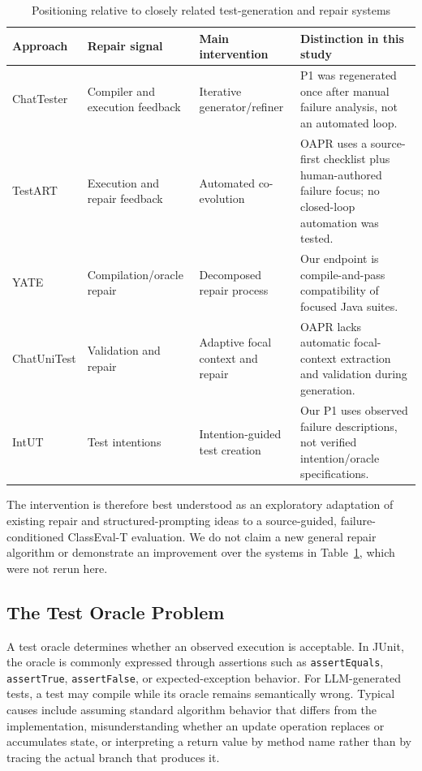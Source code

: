 \documentclass[conference]{IEEEtran}
\begin{document}
\begin{table}[t]
\caption{Positioning relative to closely related test-generation and repair systems}
\label{tab:prior}
\centering\scriptsize
\begin{tabularx}{\textwidth}{@{}l l X X@{}}
\toprule
Approach & Repair signal & Main intervention & Distinction in this study \\
\midrule
ChatTester \cite{yuan2024chattester} & Compiler and execution feedback & Iterative generator/refiner & P1 was regenerated once after manual failure analysis, not an automated loop. \\
TestART \cite{gu2024testart} & Execution and repair feedback & Automated co-evolution & OAPR uses a source-first checklist plus human-authored failure focus; no closed-loop automation was tested. \\
YATE \cite{konstantinou2025yate} & Compilation/oracle repair & Decomposed repair process & Our endpoint is compile-and-pass compatibility of focused Java suites. \\
ChatUniTest \cite{chatunitest} & Validation and repair & Adaptive focal context and repair & OAPR lacks automatic focal-context extraction and validation during generation. \\
IntUT \cite{intut} & Test intentions & Intention-guided test creation & Our P1 uses observed failure descriptions, not verified intention/oracle specifications. \\
\bottomrule
\end{tabularx}
\end{table}

The intervention is therefore best understood as an exploratory adaptation of existing repair and structured-prompting ideas to a source-guided, failure-conditioned ClassEval-T evaluation. We do not claim a new general repair algorithm or demonstrate an improvement over the systems in Table~\ref{tab:prior}, which were not rerun here.

\subsection{The Test Oracle Problem}
A test oracle determines whether an observed execution is acceptable. In JUnit, the oracle is commonly expressed through assertions such as \texttt{assertEquals}, \texttt{assertTrue}, \texttt{assertFalse}, or expected-exception behavior. For LLM-generated tests, a test may compile while its oracle remains semantically wrong. Typical causes include assuming standard algorithm behavior that differs from the implementation, misunderstanding whether an update operation replaces or accumulates state, or interpreting a return value by method name rather than by tracing the actual branch that produces it.
\end{document}
